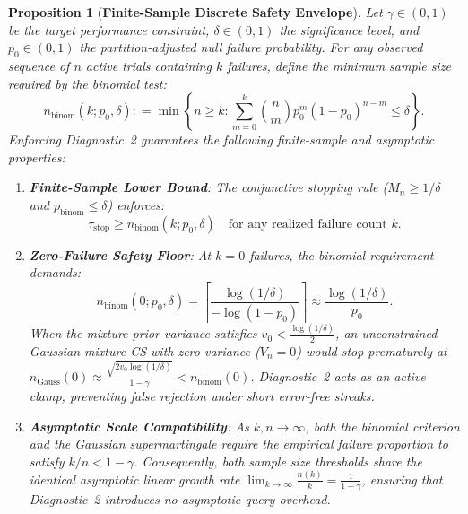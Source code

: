 \documentclass[11pt,a4paper]{article}
\newcommand{\coloneqq}{\mathrel{\mathop:}=}
\newtheorem{proposition}[theorem]{Proposition}
\begin{document}
\begin{proposition}[\textbf{Finite-Sample Discrete Safety Envelope}]\label{prop:lower_envelope}
Let $\gamma \in (0, 1)$ be the target performance constraint, $\delta \in (0, 1)$ the significance level, and $p_0 \in (0, 1)$ the partition-adjusted null failure probability.
For any observed sequence of $n$ active trials containing $k$ failures, define the minimum sample size required by the binomial test:
\begin{equation}
n_{\text{binom}}(k; p_0, \delta) \coloneqq \min \left\{ n \ge k : \sum_{m=0}^k \binom{n}{m} p_0^m (1 - p_0)^{n-m} \le \delta \right\}.
\end{equation}
Enforcing Diagnostic~2 guarantees the following finite-sample and asymptotic properties:
\begin{enumerate}[leftmargin=*]
    \item \textbf{Finite-Sample Lower Bound}: The conjunctive stopping rule ($M_n \ge 1/\delta$ and $p_{\text{binom}} \le \delta$) enforces:
    \begin{equation}
    \tau_{\text{stop}} \ge n_{\text{binom}}(k; p_0, \delta) \quad \text{for any realized failure count } k.
    \end{equation}
    \item \textbf{Zero-Failure Safety Floor}: At $k=0$ failures, the binomial requirement demands:
    \begin{equation}
    n_{\text{binom}}(0; p_0, \delta) = \left\lceil \frac{\log(1/\delta)}{-\log(1 - p_0)} \right\rceil \approx \frac{\log(1/\delta)}{p_0}.
    \end{equation}
    When the mixture prior variance satisfies $v_0 < \frac{\log(1/\delta)}{2}$, an unconstrained Gaussian mixture CS with zero variance ($V_n = 0$) would stop prematurely at $n_{\text{Gauss}}(0) \approx \frac{\sqrt{2 v_0 \log(1/\delta)}}{1 - \gamma} < n_{\text{binom}}(0)$. Diagnostic~2 acts as an active clamp, preventing false rejection under short error-free streaks.
    \item \textbf{Asymptotic Scale Compatibility}: As $k, n \to \infty$, both the binomial criterion and the Gaussian supermartingale require the empirical failure proportion to satisfy $k / n < 1 - \gamma$. Consequently, both sample size thresholds share the identical asymptotic linear growth rate $\lim_{k \to \infty} \frac{n(k)}{k} = \frac{1}{1 - \gamma}$, ensuring that Diagnostic~2 introduces no asymptotic query overhead.
\end{enumerate}
\end{proposition}
\end{document}
